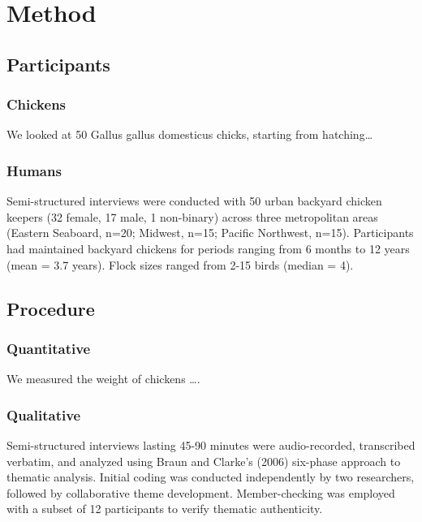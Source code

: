 \documentclass[
  man,
  floatsintext,
  longtable,
  nolmodern,
  notxfonts,
  notimes,
  colorlinks=true,linkcolor=blue,citecolor=blue,urlcolor=blue]{apa7}
\begin{document}
\section{Method}\label{method}

\subsection{Participants}\label{participants}

\subsubsection{Chickens}\label{chickens}

We looked at 50 Gallus gallus domesticus chicks, starting from
hatching\ldots{}

\subsubsection{Humans}\label{humans}

Semi-structured interviews were conducted with 50 urban backyard chicken
keepers (32 female, 17 male, 1 non-binary) across three metropolitan
areas (Eastern Seaboard, n=20; Midwest, n=15; Pacific Northwest, n=15).
Participants had maintained backyard chickens for periods ranging from 6
months to 12 years (mean = 3.7 years). Flock sizes ranged from 2-15
birds (median = 4).

\subsection{Procedure}\label{procedure}

\subsubsection{Quantitative}\label{quantitative}

We measured the weight of chickens \ldots.

\subsubsection{Qualitative}\label{qualitative}

Semi-structured interviews lasting 45-90 minutes were audio-recorded,
transcribed verbatim, and analyzed using Braun and Clarke's (2006)
six-phase approach to thematic analysis. Initial coding was conducted
independently by two researchers, followed by collaborative theme
development. Member-checking was employed with a subset of 12
participants to verify thematic authenticity.
\end{document}
